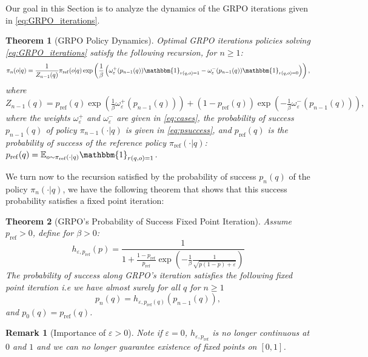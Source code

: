 \documentclass[11pt,reqno]{amsart}
\newtheorem{theorem}{Theorem}
\newtheorem{remark}{Remark}
\begin{document}
Our goal in this Section is to analyze the dynamics of the GRPO iterations given in \eqref{eq:GRPO_iterations}.

\begin{theorem} [GRPO Policy Dynamics]
Optimal GRPO iterations policies solving \eqref{eq:GRPO_iterations} satisfy the following recursion, for $n\geq 1$:
\[ \pi_{n}(o|q)  = \frac{1}{Z_{n-1}(q)}\pi_{\mathrm{ref}}(o|q) \exp \left(\frac{1}{\beta} \left( \omega^+_{\varepsilon}(p_{n-1}(q)) \mathbbm{1}_{r(q,o)=1}  - \omega^-_{\varepsilon}(p_{n-1}(q))   \mathbbm{1}_{r(q,o)=0} \right) \right),  \]
where 
$ Z_{n-1}(q) = p_{\mathrm{ref}}(q) \exp \left(\frac{1}{\beta} \omega^+_{\varepsilon}(p_{n-1}(q))   \right) +  (1-p_{\mathrm{ref}}(q))  \exp \left(- \frac{1}{\beta} \omega^-_{\varepsilon} (p_{n-1} (q)) \right) ,$
where the weights $\omega^+_\varepsilon$ and $\omega^-_{\varepsilon}$ are given in \eqref{eq:cases}, the probability of success $p_{n-1}(q)$ of policy $\pi_{n-1}(\cdot | q)$  is given in   \eqref{eq:psuccess}, and $p_{\mathrm{ref}}(q)$ is the probability of success of the reference policy $\pi_{\mathrm{ref}} (\cdot|q)$:  $ p_{\mathrm{ref}}(q) = \mathbb{E}_{o \sim \pi_{\mathrm{ref}} (\cdot | q) } \mathbbm{1}_{r(q,o)=1}$.
\label{theo:piexpression}
\end{theorem}

We turn now to the recursion satisfied by the probability of success  $p_n(q)$ of the policy $\pi_{n} (\cdot | q)$, we have the following theorem that shows that this success probability satisfies a fixed point iteration:

\begin{theorem}[GRPO's Probability of Success Fixed Point Iteration] Assume $p_{\mathrm{ref}}>0$, define  for $\beta>0$:
$$h_{\varepsilon,p_{\mathrm{ref}}}(p)   = \frac{1}{1+ \frac{1-p_{\mathrm{ref}}}{p_{\mathrm{ref}}} \exp \left(-\frac{1}{\beta}  \frac{1}{\sqrt{p(1-p) + \varepsilon}}\right) }$$
The probability of success along GRPO's iteration satisfies the following fixed point iteration i.e we have almost surely  for all $q$ for $n\geq 1$
\begin{equation}
p_{n}(q) = h_{\varepsilon,p_{\mathrm{ref}}(q)}(p_{n-1} (q)) ,
\label{eq:fixedIteration}
\end{equation}
and $p_0(q) = p_{\mathrm{ref}} (q)$.
\label{theo:IterationProba}
\end{theorem}

\begin{remark}[Importance of $\varepsilon >0$] Note if $\varepsilon=0$, $h_{\varepsilon, p_{\mathrm{ref}}}$ is no longer continuous at $0$ and $1$ and we can no longer guarantee existence of fixed points on $[0,1]$.
\end{remark}
\end{document}
